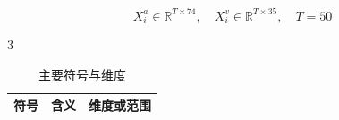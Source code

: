 \begin{equation}
X_i^a\in\mathbb{R}^{T\times74},\quad X_i^v\in\mathbb{R}^{T\times35},\quad T=50\label{q2-eq1}
\end{equation}

\begin{PaperTable}{3}

\begin{table}[!htbp]
\centering\caption{主要符号与维度\label{q2-tab2}}
\begin{tabular}{@{}lll@{}}
\toprule
\begin{minipage}[b]{\dimexpr 0.230000\linewidth-0.920000\tabcolsep\relax}\raggedright
符号\strut
\end{minipage} & \begin{minipage}[b]{\dimexpr 0.440000\linewidth-1.760000\tabcolsep\relax}\raggedright
含义\strut
\end{minipage} & \begin{minipage}[b]{\dimexpr 0.330000\linewidth-1.320000\tabcolsep\relax}\raggedright
维度或范围\strut
\end{minipage}\tabularnewline
\midrule


\end{tabular}
\end{table}
\end{PaperTable}

